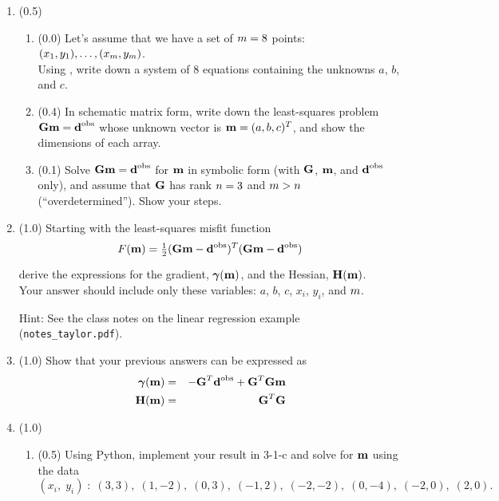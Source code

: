 \documentclass[11pt,titlepage,fleqn]{article}
\begin{document}
\begin{enumerate}
\item (0.5) 

\begin{enumerate}
\item (0.0) Let's assume that we have a set of $m=8$ points: $(x_1,y_1), \ldots, (x_{m},y_{m})$. \\
Using , write down a system of 8 equations containing the unknowns $a$, $b$, and $c$.

\item  (0.4) In schematic matrix form, write down the least-squares problem $\mbox{${\bf G}$}\mbox{${\bf m}$}=\mbox{${\bf d}$}^{\rm obs}$ whose unknown vector is $\mbox{${\bf m}$} = (a,b,c)^T$, and show the dimensions of each array.

\item (0.1) Solve $\mbox{${\bf G}$}\mbox{${\bf m}$}=\mbox{${\bf d}$}^{\rm obs}$ for $\mbox{${\bf m}$}$ in symbolic form (\ie with $\mbox{${\bf G}$}$, $\mbox{${\bf m}$}$, and $\mbox{${\bf d}$}^{\rm obs}$ only), and assume that $\mbox{${\bf G}$}$ has rank $n = 3$ and $m > n$ (``overdetermined''). Show your steps.
\end{enumerate}


\item (1.0) Starting with the least-squares misfit function
%
\begin{equation}
F(\bem) = \hlf (\bG\bem - \dvec)^T(\bG\bem - \dvec)
\end{equation}
%
derive the expressions for the gradient, $\mbox{\boldmath $\bf \gamma$}(\mbox{${\bf m}$})$, and the Hessian, $\mbox{${\bf H}$}(\mbox{${\bf m}$})$. \\
Your answer should include only these variables: $a$, $b$, $c$, $x_i$, $y_i$, and $m$.

Hint: See the class notes on the linear regression example (\verb+notes_taylor.pdf+).


\item (1.0) Show that your previous answers can be expressed as
%
\begin{eqnarray}
\mbox{\boldmath $\bf \gamma$}(\mbox{${\bf m}$}) &=& -\mbox{${\bf G}$}^T\mbox{${\bf d}$}^{\rm obs} + \mbox{${\bf G}$}^T\mbox{${\bf G}$}\mbox{${\bf m}$}
\\
\mbox{${\bf H}$}(\mbox{${\bf m}$}) &=& \mbox{${\bf G}$}^T\mbox{${\bf G}$}
\end{eqnarray}


\item (1.0)
\begin{enumerate}
\item (0.5) Using Python, implement your result in 3-1-c and solve for $\mbox{${\bf m}$}$ using the data
%
\begin{equation*}
(x_i,\;y_i) \;:\; (3,3),\;(1,-2),\;(0,3),\;(-1,2),\;(-2,-2),\;(0,-4),\;(-2,0),\;(2,0).
\end{equation*}


\end{enumerate}
\end{enumerate}
\end{document}

